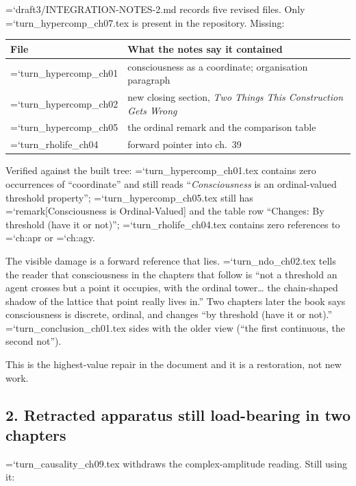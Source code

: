 \documentclass[11pt,letterpaper]{article}
\newcommand{\loc}[1]{{\small\ttfamily\color{accent}\hyphenchar\font=`\-\relax #1}}
\begin{document}
\begin{flag}
\loc{draft3/INTEGRATION-NOTES-2.md} records five revised files. Only
\loc{turn\_hypercomp\_ch07.tex} is present in the repository. Missing:

\smallskip
\begin{tabular}{@{}p{5.2cm}p{7.4cm}@{}}
\toprule
\textbf{File} & \textbf{What the notes say it contained} \\
\midrule
\loc{turn\_hypercomp\_ch01} & consciousness as a coordinate;
  organisation paragraph \\
\loc{turn\_hypercomp\_ch02} & new closing section, \emph{Two Things
  This Construction Gets Wrong} \\
\loc{turn\_hypercomp\_ch05} & the ordinal remark and the comparison
  table \\
\loc{turn\_rholife\_ch04} & forward pointer into ch.~39 \\
\bottomrule
\end{tabular}
\smallskip

Verified against the built tree: \loc{turn\_hypercomp\_ch01.tex}
contains zero occurrences of ``coordinate'' and still reads
``\emph{Consciousness} is an ordinal-valued threshold property'';
\loc{turn\_hypercomp\_ch05.tex} still has
\loc{remark}[Consciousness is Ordinal-Valued] and the table row
``Changes: By threshold (have it or not)'';
\loc{turn\_rholife\_ch04.tex} contains zero references to
\loc{ch:apr} or \loc{ch:agy}.
\end{flag}

The visible damage is a forward reference that lies.
\loc{turn\_ndo\_ch02.tex} tells the reader that consciousness in the
chapters that follow is ``not a threshold an agent crosses but a point
it occupies, with the ordinal tower\ldots{} the chain-shaped shadow of
the lattice that point really lives in.'' Two chapters later the book
says consciousness is discrete, ordinal, and changes ``by threshold
(have it or not).'' \loc{turn\_conclusion\_ch01.tex} sides with the
older view (``the first continuous, the second not'').

This is the highest-value repair in the document and it is a
restoration, not new work.

\subsection*{2. Retracted apparatus still load-bearing in two chapters}

\loc{turn\_causality\_ch09.tex} withdraws the complex-amplitude
reading. Still using it:
\end{document}
